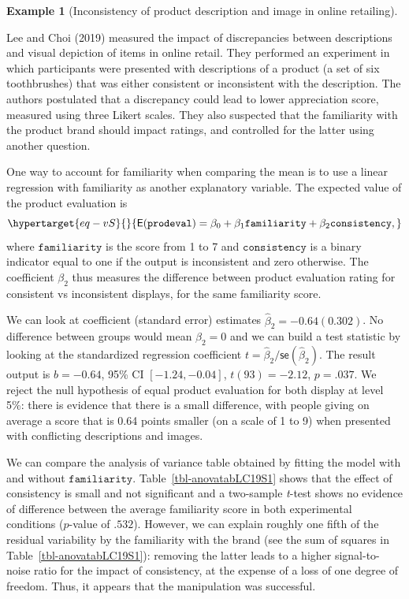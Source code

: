 \documentclass[
  11pt,
  letterpaper,
]{scrbook}
\theoremstyle{definition}
\newtheorem{example}{Example}[chapter]
\theoremstyle{remark}
\begin{document}
\begin{example}[Inconsistency of product description and image in online
retailing]\protect\hypertarget{exm-leechoi}{}\label{exm-leechoi}

Lee and Choi (2019) measured the impact of discrepancies between
descriptions and visual depiction of items in online retail. They
performed an experiment in which participants were presented with
descriptions of a product (a set of six toothbrushes) that was either
consistent or inconsistent with the description. The authors postulated
that a discrepancy could lead to lower appreciation score, measured
using three Likert scales. They also suspected that the familiarity with
the product brand should impact ratings, and controlled for the latter
using another question.

One way to account for familiarity when comparing the mean is to use a
linear regression with familiarity as another explanatory variable. The
expected value of the product evaluation is
\begin{equation}\protect\hypertarget{eq-vS}{}{
\mathsf{E}(\texttt{prodeval}) = \beta_0 + \beta_1 \texttt{familiarity} + \beta_2 \texttt{consistency}, 
}\label{eq-vS}\end{equation} where \(\texttt{familiarity}\) is the score
from 1 to 7 and \(\texttt{consistency}\) is a binary indicator equal to
one if the output is inconsistent and zero otherwise. The coefficient
\(\beta_2\) thus measures the difference between product evaluation
rating for consistent vs inconsistent displays, for the same familiarity
score.

We can look at coefficient (standard error) estimates
\(\widehat{\beta}_2 = -0.64 (0.302)\). No difference between groups
would mean \(\beta_2=0\) and we can build a test statistic by looking at
the standardized regression coefficient
\(t = \widehat{\beta}_2/\mathsf{se}(\widehat{\beta}_2)\). The result
output is \(b = -0.64\), 95\% CI \([-1.24, -0.04]\), \(t(93) = -2.12\),
\(p = .037\). We reject the null hypothesis of equal product evaluation
for both display at level 5\%: there is evidence that there is a small
difference, with people giving on average a score that is 0.64 points
smaller (on a scale of 1 to 9) when presented with conflicting
descriptions and images.

We can compare the analysis of variance table obtained by fitting the
model with and without \(\texttt{familiarity}\).
Table~\ref{tbl-anovatabLC19S1} shows that the effect of consistency is
small and not significant and a two-sample \emph{t}-test shows no
evidence of difference between the average familiarity score in both
experimental conditions (\(p\)-value of \(.532\)). However, we can
explain roughly one fifth of the residual variability by the familiarity
with the brand (see the sum of squares in
Table~\ref{tbl-anovatabLC19S1}): removing the latter leads to a higher
signal-to-noise ratio for the impact of consistency, at the expense of a
loss of one degree of freedom. Thus, it appears that the manipulation
was successful.


\end{example}
\end{document}
